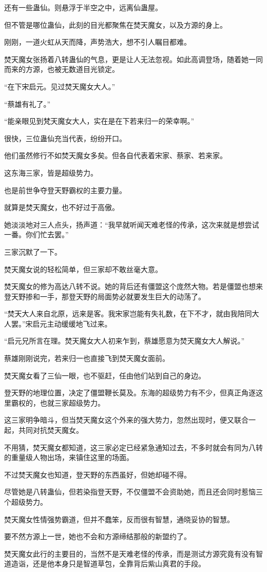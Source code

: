 \begin{this_body}
还有一些蛊仙。则悬浮于半空之中，远离仙蛊屋。

但不管是哪位蛊仙，此刻的目光都聚焦在焚天魔女，以及方源的身上。

刚刚，一道火虹从天而降，声势浩大，想不引人瞩目都难。

焚天魔女张扬着八转蛊仙的气息，更是让人无法忽视。如此高调登场，随着她一同而来的方源，也被无数道目光锁定。

“在下宋启元。见过焚天魔女大人。”

“蔡雄有礼了。”

“能亲眼见到梵天魔女大人，实在是在下若来归一的荣幸啊。”

很快，三位蛊仙充当代表，纷纷开口。

他们虽然修行不如焚天魔女多矣。但各自代表着宋家、蔡家、若来家。

这东海三家，皆是超级势力。

也是前世争夺登天野霸权的主要力量。

就算是焚天魔女，也不好过于高傲。

她淡淡地对三人点头，扬声道：“我早就听闻天难老怪的传承，这次来就是想尝试一番。你们忙去罢。”

三家沉默了一下。

焚天魔女说的轻松简单，但三家却不敢丝毫大意。

焚天魔女的修为高达八转不说。她的背后还有僵盟这个庞然大物。若是僵盟也想来登天野掺和一手，那登天野的局面势必就要发生巨大的动荡了。

“焚天大人来自北原，远来是客。我宋家岂能有失礼数，在下不才，就由我陪同大人罢。”宋启元主动缓缓地飞过来。

“启元兄所言在理。焚天魔女大人初来乍到，蔡雄愿意为焚天魔女大人解说。”

蔡雄刚刚说完，若来归一也直接飞到焚天魔女面前。

焚天魔女看了三仙一眼，也不驱赶，任由他们站到自己的身边。

登天野的地理位置，决定了僵盟鞭长莫及。东海的超级势力有不少，但真正角逐这里霸权的，也就三家超级势力。

这三家明争暗斗，但当焚天魔女这个外来的强大势力，忽然出现时，便又联合一起，共同对抗焚天魔女。

不用猜，焚天魔女都知道，这三家必定已经紧急通知过去，不多时就会有同为八转的重量级人物出场，来镇住这里的场面。

不过焚天魔女也知道，登天野的东西虽好，但她却碰不得。

尽管她是八转蛊仙，但若染指登天野，不仅僵盟不会资助她，而且还会同时惹恼三个超级势力。

焚天魔女性情强势霸道，但并不蠢笨，反而很有智慧，通晓妥协的智慧。

要不然方源上一世，她也不会和方源缔结那般的新盟约了。

焚天魔女此行的主要目的，当然不是天难老怪的传承，而是测试方源究竟有没有智道造诣，还是他本身只是智道草包，全靠背后紫山真君的手段。

\end{this_body}


